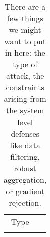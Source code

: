 \begin{table}[]
    \centering
    \begin{tabular}{c|c}
        Type &  \\
         & 
    \end{tabular}
    \caption{There are a few things we might want to put in here: the type of attack, the constraints arising from the system level defenses like data filtering, robust aggregation, or gradient rejection.}
    \label{tab:my_label}
\end{table}